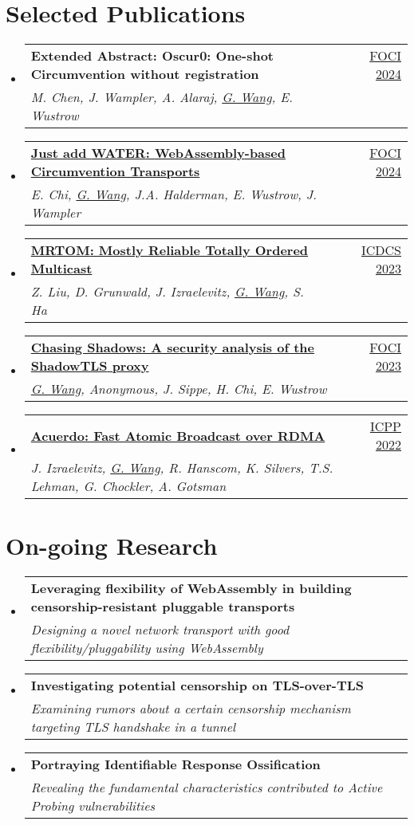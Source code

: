 \documentclass[letterpaper,11pt]{article}
\makeatletter
\newcommand{\resumeSubheading}[4]{
  \vspace{-2pt}\item
    \begin{tabular*}{0.97\textwidth}[t]{l@{\extracolsep{\fill}}r}
      \textbf{#1} & #2 \\
      \textit{\small#3} & \textit{\small #4} \\
    \end{tabular*}\vspace{-7pt}
}
\newcommand{\resumeSubHeadingListStart}{\begin{itemize}[leftmargin=0.15in, label={}]}
\newcommand{\resumeSubHeadingListEnd}{\end{itemize}}
\makeatother
\begin{document}
\section{Selected Publications}
\resumeSubHeadingListStart
  \resumeSubheading
  {\textbf{Extended Abstract: Oscur0: One-shot Circumvention without registration}}{\href{https://foci.community/foci24.html}{FOCI 2024}}
  {M. Chen, J. Wampler, A. Alaraj, \underline{G. Wang}, E. Wustrow}{}
  \resumeSubheading
  {\href{https://arxiv.org/abs/2312.00163}{\textbf{Just add {WATER}: {WebAssembly}-based Circumvention Transports}}}{\href{https://foci.community/foci24.html}{FOCI 2024}}
  {E. Chi, \underline{G. Wang}, J.A. Halderman, E. Wustrow, J. Wampler}{}
  \resumeSubheading
  {\href{https://ieeexplore.ieee.org/document/10272412}{\textbf{{MRTOM}: Mostly Reliable Totally Ordered Multicast}}}{\href{https://icdcs2023.icdcs.org/}{ICDCS 2023}}
  {Z. Liu, D. Grunwald, J. Izraelevitz, \underline{G. Wang}, S. Ha}{}
  \resumeSubheading
  {\href{https://www.petsymposium.org/foci/2023/foci-2023-0002.php}{\textbf{{Chasing Shadows}: A security analysis of the {ShadowTLS} proxy}}}{\href{https://foci.community/foci23.html}{FOCI 2023}}
  {\underline{G. Wang}, Anonymous, J. Sippe, H. Chi, E. Wustrow}{}
  \resumeSubheading
  {\href{https://dl.acm.org/doi/abs/10.1145/3545008.3545041}{\textbf{Acuerdo: Fast Atomic Broadcast over {RDMA}}}}{\href{https://icpp22.gitlabpages.inria.fr/}{ICPP 2022}}
  {J. Izraelevitz, \underline{G. Wang}, R. Hanscom, K. Silvers, T.S. Lehman, G. Chockler, A. Gotsman}{}
\resumeSubHeadingListEnd
\vspace{1pt}

\section{On-going Research}
\resumeSubHeadingListStart
  \resumeSubheading
  {\textbf{Leveraging flexibility of {WebAssembly} in building censorship-resistant pluggable transports}}{}
  {Designing a novel network transport with good flexibility/pluggability using WebAssembly}{}
  \resumeSubheading
  {\textbf{Investigating potential censorship on TLS-over-TLS}}{}
  {Examining rumors about a certain censorship mechanism targeting TLS handshake in a tunnel}{}
  \resumeSubheading
  {\textbf{Portraying Identifiable Response Ossification}}{}
  {Revealing the fundamental characteristics contributed to Active Probing vulnerabilities}{}
\resumeSubHeadingListEnd
\vspace{1pt}
\end{document}
